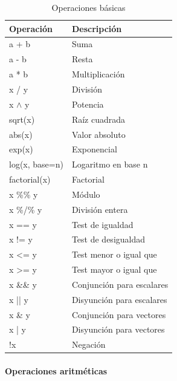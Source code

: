 \documentclass[11pt,a4paper,oneside]{book}\usepackage[]{graphicx}\usepackage[]{color}
\begin{document}
\begin{itemize}
\begin{table}[H]
\centering
\begin{tabular}{ll}\hline \hline
{\bf Operación} & {\bf Descripción}\\ \hline \hline
a + b & Suma \\ \hline
a - b & Resta \\ \hline
a * b & Multiplicación \\ \hline
x / y & División \\ \hline
x $\land$ y & Potencia \\ \hline
sqrt(x) & Raíz cuadrada \\ \hline
abs(x) & Valor absoluto \\ \hline
exp(x) & Exponencial \\ \hline
log(x, base=n) & Logaritmo en base n \\ \hline
factorial(x) & Factorial \\ \hline
x \%\% y & Módulo \\ \hline
x \%/\% y & División entera \\ \hline
x == y & Test de igualdad \\ \hline
x != y & Test de desigualdad \\ \hline
x <= y & Test menor o igual que \\ \hline
x >= y & Test mayor o igual que \\ \hline
x \&\& y & Conjunción para escalares \\ \hline
x || y & Disyunción para escalares \\ \hline
x \& y & Conjunción para vectores \\ \hline
x | y & Disyunción para vectores \\ \hline
!x & Negación \\ \hline
\end{tabular}
\caption{Operaciones básicas}
\end{table}

\paragraph{Operaciones aritméticas}
~\\


\end{itemize}
\end{document}
